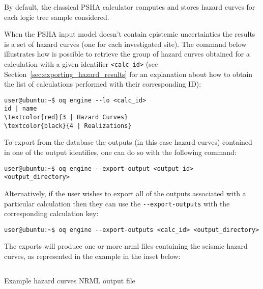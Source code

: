 By default, the classical PSHA calculator computes and stores hazard curves
for each logic tree sample considered.

When the PSHA input model doesn't contain epistemic uncertainties the results
is a set of hazard curves (one for each investigated site). The command below
illustrates how is possible to retrieve the group of hazard curves obtained
for a calculation with a given identifier \texttt{<calc\_id>} (see
Section~\ref{sec:exporting_hazard_results} for an explanation about how to
obtain the list of calculations performed with their corresponding ID):

\begin{Verbatim}[frame=single, commandchars=\\\{\}, fontsize=\small]
user@ubuntu:~$ oq engine --lo <calc_id>
id | name
\textcolor{red}{3 | Hazard Curves}
\textcolor{black}{4 | Realizations}
\end{Verbatim}

To export from the database the outputs (in this case hazard curves) contained
in one of the output identifies, one can do so with the following command:

\begin{Verbatim}[frame=single, commandchars=\\\{\}, fontsize=\small]
user@ubuntu:~$ oq engine --export-output <output_id> <output_directory>
\end{Verbatim}

Alternatively, if the user wishes to export all of the outputs associated with
a particular calculation then they can use the \texttt{-{}-export-outputs}
with the corresponding calculation key:

\begin{Verbatim}[frame=single, commandchars=\\\{\}, fontsize=\small]
user@ubuntu:~$ oq engine --export-outputs <calc_id> <output_directory>
\end{Verbatim}

The exports will produce one or more nrml files containing the seismic hazard
curves, as represented in the example in the inset below:

\begin{listing}[htbp]
  \inputminted[firstline=1,firstnumber=1,fontsize=\footnotesize,frame=single,linenos,bgcolor=lightgray]{xml}{oqum/hazard/verbatim/output_hazard_curves.xml}
  \caption{Example hazard curves NRML output file}
  \label{lst:output_hazard_curves_xml}
\end{listing}

